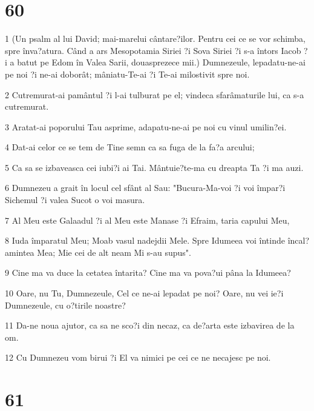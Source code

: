 \chapter{60}

\par 1 (Un psalm al lui David; mai-marelui cântare?ilor. Pentru cei ce se vor schimba, spre înva?atura. Când a ars Mesopotamia Siriei ?i Sova Siriei ?i s-a întors Iacob ?i a batut pe Edom în Valea Sarii, douasprezece mii.) Dumnezeule, lepadatu-ne-ai pe noi ?i ne-ai doborât; mâniatu-Te-ai ?i Te-ai milostivit spre noi.
\par 2 Cutremurat-ai pamântul ?i l-ai tulburat pe el; vindeca sfarâmaturile lui, ca s-a cutremurat.
\par 3 Aratat-ai poporului Tau asprime, adapatu-ne-ai pe noi cu vinul umilin?ei.
\par 4 Dat-ai celor ce se tem de Tine semn ca sa fuga de la fa?a arcului;
\par 5 Ca sa se izbaveasca cei iubi?i ai Tai. Mântuie?te-ma cu dreapta Ta ?i ma auzi.
\par 6 Dumnezeu a grait în locul cel sfânt al Sau: "Bucura-Ma-voi ?i voi împar?i Sichemul ?i valea Sucot o voi masura.
\par 7 Al Meu este Galaadul ?i al Meu este Manase ?i Efraim, taria capului Meu,
\par 8 Iuda împaratul Meu; Moab vasul nadejdii Mele. Spre Idumeea voi întinde încal?amintea Mea; Mie cei de alt neam Mi s-au supus".
\par 9 Cine ma va duce la cetatea întarita? Cine ma va pova?ui pâna la Idumeea?
\par 10 Oare, nu Tu, Dumnezeule, Cel ce ne-ai lepadat pe noi? Oare, nu vei ie?i Dumnezeule, cu o?tirile noastre?
\par 11 Da-ne noua ajutor, ca sa ne sco?i din necaz, ca de?arta este izbavirea de la om.
\par 12 Cu Dumnezeu vom birui ?i El va nimici pe cei ce ne necajesc pe noi.

\chapter{61}

